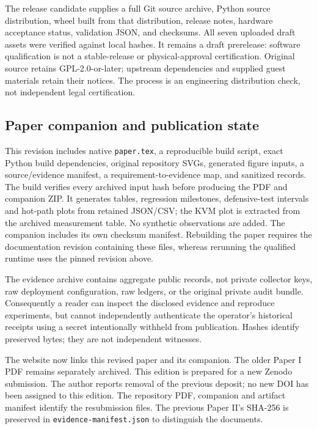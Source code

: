 \documentclass[journal]{IEEEtran}
\newcommand{\code}[1]{\texttt{#1}}
\begin{document}


The release candidate supplies a full Git source archive, Python source distribution, wheel built from that distribution, release notes, hardware acceptance status, validation JSON, and checksums. All seven uploaded draft assets were verified against local hashes. It remains a draft prerelease: software qualification is not a stable-release or physical-approval certification. Original source retains GPL-2.0-or-later; upstream dependencies and supplied guest materials retain their notices. The process is an engineering distribution check, not independent legal certification.

\subsection{Paper companion and publication state}
This revision includes native \code{paper.tex}, a reproducible build script, exact Python build dependencies, original repository SVGs, generated figure inputs, a source/evidence manifest, a requirement-to-evidence map, and sanitized records. The build verifies every archived input hash before producing the PDF and companion ZIP. It generates tables, regression milestones, defensive-test intervals and hot-path plots from retained JSON/CSV; the KVM plot is extracted from the archived measurement table. No synthetic observations are added. The companion includes its own checksum manifest. Rebuilding the paper requires the documentation revision containing these files, whereas rerunning the qualified runtime uses the pinned revision above.

The evidence archive contains aggregate public records, not private collector keys, raw deployment configuration, raw ledgers, or the original private audit bundle. Consequently a reader can inspect the disclosed evidence and reproduce experiments, but cannot independently authenticate the operator's historical receipts using a secret intentionally withheld from publication. Hashes identify preserved bytes; they are not independent witnesses.

The website now links this revised paper and its companion. The older Paper I PDF remains separately archived. This edition is prepared for a new Zenodo submission. The author reports removal of the previous deposit; no new DOI has been assigned to this edition. The repository PDF, companion and artifact manifest identify the resubmission files. The previous Paper II's SHA-256 is preserved in \code{evidence-manifest.json} to distinguish the documents.
\end{document}
